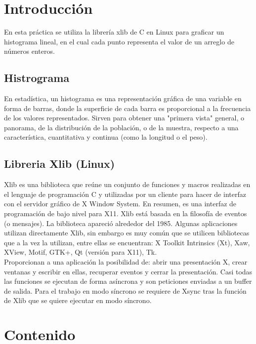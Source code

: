 \documentclass[11pt,letterpaper]{article}
\begin{document}


\section*{Introducción}
En esta práctica se utiliza la librería xlib de C en Linux para graficar un histograma lineal, en el cual cada punto representa el valor de un arreglo de números enteros.

\subsection*{Histrograma}
En estadística, un histograma es una representación gráfica de una variable en forma de barras, donde la superficie de cada barra es proporcional a la frecuencia de los valores representados. Sirven para obtener una "primera vista" general, o panorama, de la distribución de la población, o de la muestra, respecto a una característica, cuantitativa y continua (como la longitud o el peso).\\

\subsection*{Libreria Xlib (Linux)}
Xlib es una biblioteca que reúne un conjunto de funciones y macros realizadas en el lenguaje de programación C y utilizadas por un cliente para hacer de interfaz con el servidor gráfico de X Window System.​ En resumen, es una interfaz de programación de bajo nivel para X11. Xlib está basada en la filosofía de eventos (o mensajes). La biblioteca apareció alrededor del 1985. Algunas aplicaciones utilizan directamente Xlib, sin embargo es muy común que se utilicen bibliotecas que a la vez la utilizan, entre ellas se encuentran: X Toolkit Intrinsics (Xt), Xaw, XView, Motif, GTK+, Qt (versión para X11), Tk.\\

Proporcionan a una aplicación la posibilidad de: abrir una presentación X, crear ventanas y escribir en ellas, recuperar eventos y cerrar la presentación. Casi todas las funciones se ejecutan de forma asíncrona y son peticiones enviadas a un buffer de salida. Para el trabajo en modo síncrono se requiere de Xsync tras la función de Xlib que se quiere ejecutar en modo síncrono. 

\section*{Contenido}
\end{document}
